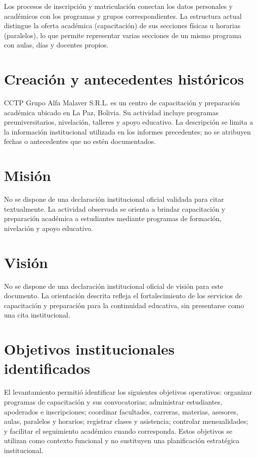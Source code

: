 \documentclass[12pt,a4paper,oneside]{report}
\begin{document}
Los procesos de inscripción y matriculación conectan los datos personales y académicos con los programas y grupos correspondientes. La estructura actual distingue la oferta académica (capacitación) de sus secciones físicas u horarias (paralelos), lo que permite representar varias secciones de un mismo programa con aulas, días y docentes propios.

\section{Creación y antecedentes históricos}

CCTP Grupo Alfa Malaver S.R.L. es un centro de capacitación y preparación académica ubicado en La Paz, Bolivia. Su actividad incluye programas preuniversitarios, nivelación, talleres y apoyo educativo. La descripción se limita a la información institucional utilizada en los informes precedentes; no se atribuyen fechas o antecedentes que no estén documentados.

\section{Misión}

No se dispone de una declaración institucional oficial validada para citar textualmente. La actividad observada se orienta a brindar capacitación y preparación académica a estudiantes mediante programas de formación, nivelación y apoyo educativo.

\section{Visión}

No se dispone de una declaración institucional oficial de visión para este documento. La orientación descrita refleja el fortalecimiento de los servicios de capacitación y preparación para la continuidad educativa, sin presentarse como una cita institucional.

\section{Objetivos institucionales identificados}

El levantamiento permitió identificar los siguientes objetivos operativos: organizar programas de capacitación y sus convocatorias; administrar estudiantes, apoderados e inscripciones; coordinar facultades, carreras, materias, asesores, aulas, paralelos y horarios; registrar clases y asistencia; controlar mensualidades; y facilitar el seguimiento académico cuando corresponda. Estos objetivos se utilizan como contexto funcional y no sustituyen una planificación estratégica institucional.
\end{document}
